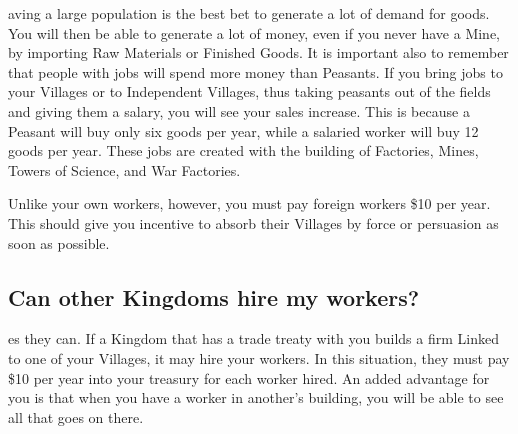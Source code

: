 aving a large population is the best bet to generate a lot of demand for goods. You will then be able to generate a lot of money, even if you never have a Mine, by importing Raw Materials or Finished Goods. It is important also to remember that people with jobs will spend more money than Peasants. If you bring jobs to your Villages or to Independent Villages, thus taking peasants out of the fields and giving them a salary, you will see your sales increase. This is because a Peasant will buy only six goods per year, while a salaried worker will buy 12 goods per year. These jobs are created with the building of Factories, Mines, Towers of Science, and War Factories.

Unlike your own workers, however, you must pay foreign workers \$10 per year. This should give you incentive to absorb their Villages by force or persuasion as soon as possible.

\subsection{Can other Kingdoms hire my workers?}

es they can. If a Kingdom that has a trade treaty with you builds a firm Linked to one of your Villages, it may hire your workers. In this situation, they must pay \$10 per year into your treasury for each worker hired. An added advantage for you is that when you have a worker in another’s building, you will be able to see all that goes on there.
